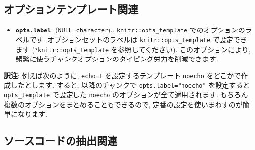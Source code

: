 \documentclass[
  11pt,
]{bxjsreport}
\newenvironment{Shaded}{\begin{snugshade}}{\end{snugshade}}
\newcommand{\AttributeTok}[1]{\textcolor[rgb]{0.77,0.63,0.00}{#1}}
\newcommand{\FunctionTok}[1]{\textcolor[rgb]{0.00,0.00,0.00}{#1}}
\newcommand{\NormalTok}[1]{#1}
\newcommand{\SpecialCharTok}[1]{\textcolor[rgb]{0.00,0.00,0.00}{#1}}
\newcommand{\StringTok}[1]{\textcolor[rgb]{0.31,0.60,0.02}{#1}}
\providecommand{\tightlist}{%
  \setlength{\itemsep}{0pt}\setlength{\parskip}{0pt}}
\begin{document}
\begin{Shaded}
\end{Shaded}

\hypertarget{ux30aaux30d7ux30b7ux30e7ux30f3ux30c6ux30f3ux30d7ux30ecux30fcux30c8ux95a2ux9023}{%
\subsection{オプションテンプレート関連}\label{ux30aaux30d7ux30b7ux30e7ux30f3ux30c6ux30f3ux30d7ux30ecux30fcux30c8ux95a2ux9023}}

\begin{itemize}
\tightlist
\item
  \textbf{\texttt{opts.label}}: (\texttt{NULL}; \texttt{character}).: \texttt{knitr::opts\_template} でのオプションのラベルです. オプションセットのラベルは \texttt{knitr::opts\_template} で設定できます (\texttt{?knitr::opts\_template} を参照してください). このオプションにより, 頻繁に使うチャンクオプションのタイピング労力を削減できます.
\end{itemize}

\textbf{訳注}: 例えば次のように, \texttt{echo=F} を設定するテンプレート \texttt{noecho} をどこかで作成したとします. すると, 以降のチャンクで \texttt{opts.label="noecho"} を設定すると \texttt{opts\_template} で設定した \texttt{noecho} のオプションが全て適用されます. もちろん複数のオプションをまとめることもできるので, 定番の設定を使いまわすのが簡単になります.

\begin{Shaded}
\end{Shaded}

\hypertarget{ux30bdux30fcux30b9ux30b3ux30fcux30c9ux306eux62bdux51faux95a2ux9023}{%
\subsection{ソースコードの抽出関連}\label{ux30bdux30fcux30b9ux30b3ux30fcux30c9ux306eux62bdux51faux95a2ux9023}}
\end{document}
